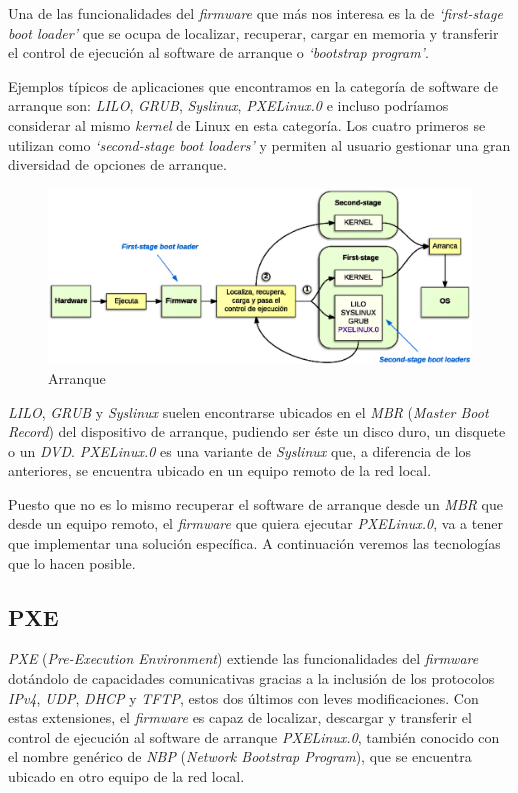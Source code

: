 \documentclass[a4paper,12pt,spanish,final]{epsc_tfc_pfc}
\begin{document}
Una de las funcionalidades del \emph{firmware} que más nos interesa es la de \emph{`first-stage boot loader'} que se ocupa de localizar, recuperar, cargar en memoria y transferir el control de ejecución al software de arranque o \emph{`bootstrap program'}.

Ejemplos típicos de aplicaciones que encontramos en la categoría de software de arranque son: \emph{LILO}, \emph{GRUB}, \emph{Syslinux}, \emph{PXELinux.0} e incluso podríamos considerar al mismo \emph{kernel} de Linux en esta categoría. Los cuatro primeros se utilizan como \emph{`second-stage boot loaders'} y permiten al usuario gestionar una gran diversidad de opciones de arranque.

\begin{figure}[h]
  \centering
    \includegraphics[scale=0.9]{arranque}
      \caption{Arranque}
\end{figure}

\emph{LILO}, \emph{GRUB} y \emph{Syslinux} suelen encontrarse ubicados en el \emph{MBR} (\emph{Master Boot Record}) del dispositivo de arranque, pudiendo ser éste un disco duro, un disquete o un \emph{DVD}. \emph{PXELinux.0} es una variante de \emph{Syslinux} que, a diferencia de los anteriores, se encuentra ubicado en un equipo remoto de la red local.

Puesto que no es lo mismo recuperar el software de arranque desde un \emph{MBR} que desde un equipo remoto, el \emph{firmware} que quiera ejecutar \emph{PXELinux.0}, va a tener que implementar una solución específica. A continuación veremos las tecnologías que lo hacen posible.

\subsection{PXE}
\emph{PXE} (\emph{Pre-Execution Environment}) extiende las funcionalidades del \emph{firmware} dotándolo de capacidades comunicativas gracias a la inclusión de los protocolos \emph{IPv4}, \emph{UDP}, \emph{DHCP} y \emph{TFTP}, estos dos últimos con leves modificaciones. Con estas extensiones, el \emph{firmware} es capaz de localizar, descargar y transferir el control de ejecución al software de arranque \emph{PXELinux.0}, también conocido con el nombre genérico de \emph{NBP} (\emph{Network Bootstrap Program}), que se encuentra ubicado en otro equipo de la red local.
\end{document}
